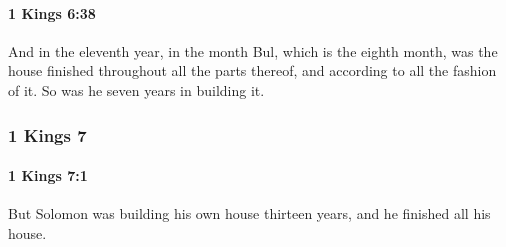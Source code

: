 		\paragraph{1 Kings 6:38} %
			\label{1KINGS-6-38}

			And in the eleventh year, in the month Bul, which is the eighth month, was the house finished throughout all the parts thereof, and according to all the fashion of it. So was he seven years in building it.

	\subsubsection{1 Kings 7} %
		\label{1KINGS-7}

		\paragraph{1 Kings 7:1} %
			\label{1KINGS-7-1}

			But Solomon was building his own house thirteen years, and he finished all his house.

